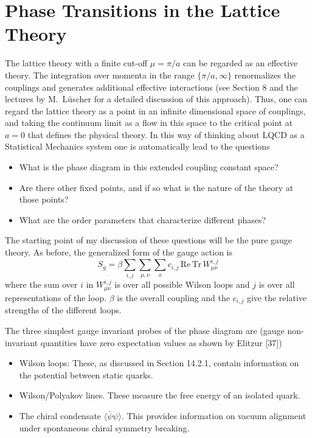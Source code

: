 
\chapter{Phase Transitions in the Lattice Theory}

The lattice theory with a finite cut-off $\mu = \pi/a$ can be regarded as an effective theory. The integration over momenta in the range $\{\pi/a, \infty\}$ renormalizes the couplings and generates additional effective interactions (see Section 8 and the lectures by M.~L\"uscher for a detailed discussion of this approach). Thus, one can regard the lattice theory as a point in an infinite dimensional space of couplings, and taking the continuum limit as a flow in this space to the critical point at $a = 0$ that defines the physical theory. In this way of thinking about LQCD as a Statistical Mechanics system one is automatically lead to the questions
\begin{itemize}
\item What is the phase diagram in this extended coupling constant space?
\item Are there other fixed points, and if so what is the nature of the theory at those points?
\item What are the order parameters that characterize different phases?
\end{itemize}

The starting point of my discussion of these questions will be the pure gauge theory. As before, the generalized form of the gauge action is
\begin{equation}
S_g = \beta \sum_{i,j} \sum_{\mu,\nu} \sum_x c_{i,j}\, \mathrm{Re}\, \mathrm{Tr}\, W^{i,j}_{\mu\nu}
\end{equation}
where the sum over $i$ in $W^{i,j}_{\mu\nu}$ is over all possible Wilson loops and $j$ is over all representations of the loop. $\beta$ is the overall coupling and the $c_{i,j}$ give the relative strengths of the different loops.

The three simplest gauge invariant probes of the phase diagram are (gauge non-invariant quantities have zero expectation values as shown by Elitzur [37])
\begin{itemize}
\item Wilson loops: These, as discussed in Section 14.2.1, contain information on the potential between static quarks.
\item Wilson/Polyakov lines. These measure the free energy of an isolated quark.
\item The chiral condensate $\langle \bar{\psi}\psi\rangle$. This provides information on vacuum alignment under spontaneous chiral symmetry breaking.
\end{itemize}

